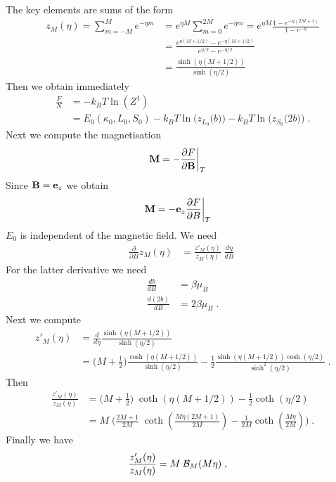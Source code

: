 The key elements are  sums of the form
%
\begin{align*}
{z}_{M}(\eta) =\sum_{m=-M}^{M} e^{-\eta m} &= e^{\eta M}\sum_{m=0}^{2M} e^{-\eta m}
=
e^{\eta M} \frac{1 - e^{-\eta (2 M+1)}}{1-e^{-\eta}}\\
&= \frac{e^{\eta(M+1/2)} - e^{-\eta (M+1/2)}}{e^{\eta/2}-e^{-\eta/2}}\\
&=\frac{\sinh(\eta(M+1/2))}{\sinh(\eta/2)}
\end{align*}
%
Then we obtain immediately
%
\begin{align*}
\frac{F}{N} &=  -  k_{B} T \ln(Z^{1})\\
&= E_{0}(\kappa_{0},L_{0},S_{0})
-k_{B}T \ln\bigg(z_{L_{0}}\big(b\big) \bigg)
-k_{B}T \ln\bigg(z_{S_{0}}\big(2 b\big)\bigg)\;.
\end{align*}
%
Next we compute the magnetisation
%
\begin{align*}
\mathbf M &= - \frac{\partial F}{\partial \mathbf B}\bigg|_{T}
\end{align*}
%
Since $\mathbf B = \mathbf e_{z}$ we obtain 
\begin{align*}
\mathbf M &= - \mathbf e_{z}\frac{\partial F}{\partial B}\bigg|_{T}
\end{align*}
%
$E_{0}$ is independent of the magnetic field. We need
%
\begin{align*}
\frac{\partial }{\partial B} z_{M}(\eta) &=
\frac{z'_{M}(\eta)}{z_{M}(\eta)} \;\frac{d \eta }{d B}\;
\end{align*}
%
For the latter derivative we need
%
\begin{align*}
\frac{d  b}{d B} &= \beta \mu_{B}\\
\frac{d (2 b)}{d B} &= 2\beta \mu_{B}\;.
\end{align*}
%
Next we compute 
%
\begin{align*}
z'_{M}(\eta) &= \frac{d}{d\eta} 
\frac{\sinh(\eta(M+1/2))}{\sinh(\eta/2)}\\
&=
\big( M+\frac{1}{2} \big)\frac{\cosh(\eta(M+1/2))}{\sinh(\eta/2)}
-\frac{1}{2}\frac{\sinh(\eta(M+1/2))\cosh(\eta/2)}{\sinh^{2}(\eta/2)}\;.
\end{align*}
%
Then
%
\begin{align*}
\frac{z'_{M}(\eta)}{z_{M}(\eta)}
&=\big( M+\frac{1}{2} \big)\;\coth(\eta(M+1/2))-\frac{1}{2}\coth(\eta/2)\\
&=M\;\bigg( \frac{2M+1}{2M}\;\coth(\frac{M\eta (2M+1)}{2M})-\frac{1}{2M}\coth(\frac{M\eta}{2M})\bigg)\;.
\end{align*}
Finally we have
%
\begin{align}\label{eq:para:8}
\frac{z'_{M}(\eta)}{z_{M}(\eta)}&=M\; {\cal B}_{M}(M\eta)\;,
\end{align}
